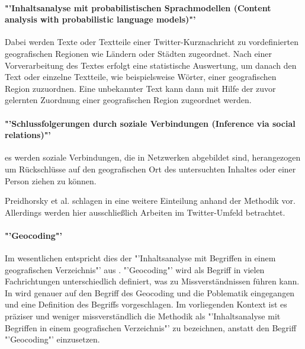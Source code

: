 		\paragraph*{"'Inhaltsanalyse mit probabilistischen Sprachmodellen (Content analysis with probabilistic language models)"'}
		Dabei werden Texte oder Textteile einer Twitter-Kurznachricht zu vordefinierten geografischen Regionen wie Ländern oder Städten zugeordnet. 
		Nach einer Vorverarbeitung des Textes erfolgt eine statistische Auswertung, um danach den Text oder einzelne Textteile, wie beispielsweise Wörter, einer geografischen Region zuzuordnen. 
		Eine unbekannter Text kann dann mit Hilfe der zuvor gelernten Zuordnung einer geografischen Region zugeordnet werden.

		\paragraph*{"'Schlussfolgerungen durch soziale Verbindungen (Inference via social relations)"'} es werden soziale Verbindungen, die in Netzwerken abgebildet sind, herangezogen um Rückschlüsse auf den geografischen Ort des untersuchten Inhaltes oder einer Person ziehen zu können.

		Preidhorsky et al. schlagen in \cite{Priedhorsky2013} eine weitere Einteilung anhand der Methodik vor. 
		Allerdings werden hier ausschließlich Arbeiten im Twitter-Umfeld betrachtet. 

		\paragraph*{"'Geocoding"'} Im wesentlichen entspricht dies der "'Inhaltsanalyse mit Begriffen in einem geografischen Verzeichnis"' aus \cite{Cheng2010}. 
		"'Geocoding"' wird als Begriff in vielen Fachrichtungen unterschiedlich definiert, was zu Missverständnissen führen kann. 
		In \cite{bibsmaniaaa:Goldberg2008} wird genauer auf den Begriff des Geocoding und die Poblematik eingegangen und eine Definition  des Begriffs vorgeschlagen.
		Im vorliegenden Kontext ist es präziser und weniger missverständlich die Methodik als "'Inhaltsanalyse mit Begriffen in einem geografischen Verzeichnis"' zu bezeichnen, anstatt den Begriff "'Geocoding"' einzusetzen. 
		
